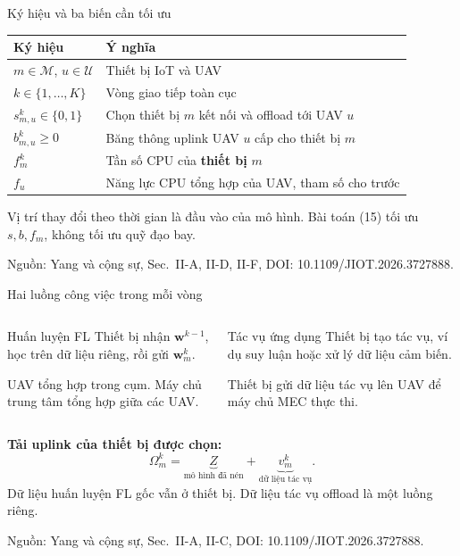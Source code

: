 \documentclass[aspectratio=169,11pt]{beamer}
\newcommand{\source}[1]{\par\vfill{\tiny\color{Muted}Nguồn: #1\par}}
\newcommand{\paperref}[1]{\source{Yang và cộng sự, Sec.~#1, DOI: 10.1109/JIOT.2026.3727888.}}
\begin{document}
\begin{frame}{Ký hiệu và ba biến cần tối ưu}
  \begin{tabularx}{\textwidth}{@{}lX@{}}
    \toprule
    \textbf{Ký hiệu} & \textbf{Ý nghĩa}\\
    \midrule
    $m\in\mathcal M$, $u\in\mathcal U$ & Thiết bị IoT và UAV\\[0.2em]
    $k\in\{1,\ldots,K\}$ & Vòng giao tiếp toàn cục\\[0.2em]
    $s^k_{m,u}\in\{0,1\}$ & Chọn thiết bị $m$ kết nối và offload tới UAV $u$\\[0.2em]
    $b^k_{m,u}\geq0$ & Băng thông uplink UAV $u$ cấp cho thiết bị $m$\\[0.2em]
    $f_m^k$ & Tần số CPU của \textbf{thiết bị} $m$\\[0.2em]
    $f_u$ & Năng lực CPU tổng hợp của UAV, tham số cho trước\\
    \bottomrule
  \end{tabularx}
  \par\vspace{0.3cm}
  Vị trí thay đổi theo thời gian là đầu vào của mô hình. Bài toán (15) tối ưu $s,b,f_m$, không tối ưu quỹ đạo bay.
  \paperref{II-A, II-D, II-F}
\end{frame}

\begin{frame}{Hai luồng công việc trong mỗi vòng}
  \begin{columns}[T,onlytextwidth]
      \begin{block}{Huấn luyện FL}
        Thiết bị nhận $\mathbf w^{k-1}$, học trên dữ liệu riêng, rồi gửi $\mathbf w_m^k$.

        UAV tổng hợp trong cụm. Máy chủ trung tâm tổng hợp giữa các UAV.
      \end{block}
      \begin{block}{Tác vụ ứng dụng}
        Thiết bị tạo tác vụ, ví dụ suy luận hoặc xử lý dữ liệu cảm biến.

        Thiết bị gửi dữ liệu tác vụ lên UAV để máy chủ MEC thực thi.
      \end{block}
  \end{columns}
  \vspace{0.35cm}
  \textbf{Tải uplink của thiết bị được chọn:}
  \[
    \Omega_m^k = \underbrace{Z}_{\text{mô hình đã nén}}
                    +\underbrace{v_m^k}_{\text{dữ liệu tác vụ}}.
  \]
  Dữ liệu huấn luyện FL gốc vẫn ở thiết bị. Dữ liệu tác vụ offload là một luồng riêng.
  \paperref{II-A, II-C}
\end{frame}
\end{document}
